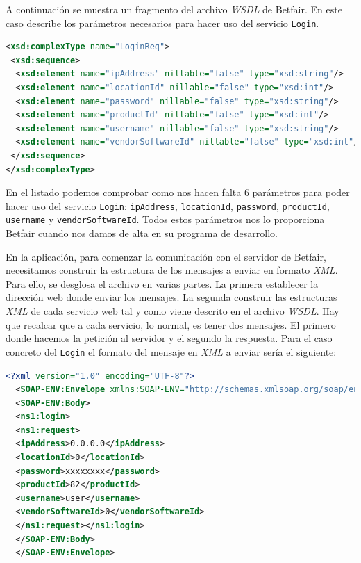    A continuación se muestra un fragmento del archivo \emph{WSDL} de Betfair. En este caso describe los parámetros necesarios para hacer uso del servicio \lstinline{Login}.
   
\begin{lstlisting}[language=xml]
<xsd:complexType name="LoginReq">
 <xsd:sequence>
  <xsd:element name="ipAddress" nillable="false" type="xsd:string"/>
  <xsd:element name="locationId" nillable="false" type="xsd:int"/>
  <xsd:element name="password" nillable="false" type="xsd:string"/>
  <xsd:element name="productId" nillable="false" type="xsd:int"/>
  <xsd:element name="username" nillable="false" type="xsd:string"/>
  <xsd:element name="vendorSoftwareId" nillable="false" type="xsd:int"/>
 </xsd:sequence>
</xsd:complexType>
\end{lstlisting}

   En el listado podemos comprobar como nos hacen falta 6 parámetros para poder hacer uso del servicio \lstinline{Login}: \lstinline{ipAddress}, \lstinline{locationId}, \lstinline{password}, \lstinline{productId}, \lstinline{username} y \lstinline{vendorSoftwareId}. Todos estos parámetros nos lo proporciona Betfair cuando nos damos de alta en su programa de desarrollo.
   
   En la aplicación, para comenzar la comunicación con el servidor de Betfair, necesitamos construir la estructura de los mensajes a enviar en formato \emph{XML}. Para ello, se desglosa el archivo en varias partes. La primera establecer la dirección web donde enviar los mensajes. La segunda construir las estructuras \emph{XML} de cada servicio web tal y como viene descrito en el archivo \emph{WSDL}. Hay que recalcar que a cada servicio, lo normal, es tener dos mensajes. El primero donde hacemos la petición al servidor y el segundo la respuesta. Para el caso concreto del \lstinline{Login} el formato del mensaje en \emph{XML} a enviar sería el siguiente:
 
\begin{lstlisting}[language=xml]
  <?xml version="1.0" encoding="UTF-8"?>
  <SOAP-ENV:Envelope xmlns:SOAP-ENV="http://schemas.xmlsoap.org/soap/envelope/" xmlns:SOAP-ENC="http://schemas.xmlsoap.org/soap/encoding/" xmlns:xsi="http://www.w3.org/2001/XMLSchema-instance" xmlns:xsd="http://www.w3.org/2001/XMLSchema" xmlns:ns2="http://www.betfair.com/publicapi/types/global/v3/" xmlns:ns1="http://www.betfair.com/publicapi/v3/BFGlobalService/">
  <SOAP-ENV:Body>
  <ns1:login>
  <ns1:request>
  <ipAddress>0.0.0.0</ipAddress>
  <locationId>0</locationId>
  <password>xxxxxxxx</password>
  <productId>82</productId>
  <username>user</username>
  <vendorSoftwareId>0</vendorSoftwareId>
  </ns1:request></ns1:login>
  </SOAP-ENV:Body>
  </SOAP-ENV:Envelope> 
 \end{lstlisting}
 
